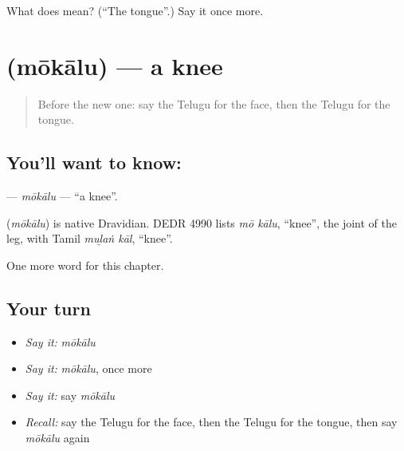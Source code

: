 \begin{tcolorbox}[breakable,colback=teal!4,colframe=teal!35!black,title={Before you move on}]
What does  mean? (\textquotedblleft{}The tongue\textquotedblright{}.) Say it once more.
\end{tcolorbox}
\section[\texorpdfstring{\te{మోకాలు} (mōkālu)}{మోకాలు (mōkālu)}]{ (mōkālu) — a knee}

\label{lesson:TE-C127-mokalu}



\begin{quote}
Before the new one: say the Telugu for the face, then the Telugu for the tongue.
\end{quote}

\subsection*{You'll want to know: }
\textbf{} — \emph{mōkālu} — \textquotedblleft{}a knee\textquotedblright{}.

\begin{cousinweb}
\textbf{} (\emph{mōkālu}) is native Dravidian. DEDR 4990 lists \emph{mō kālu}, \textquotedblleft{}knee\textquotedblright{}, the joint of the leg, with Tamil \emph{muḻaṅ kāl}, \textquotedblleft{}knee\textquotedblright{}.
\end{cousinweb}

\begin{grammarlens}[title={What you've built}]
One more word for this chapter.
\end{grammarlens}

\subsection*{Your turn}
\begin{itemize}
\raggedright
  \item \emph{Say it:} \emph{mōkālu}
  \item \emph{Say it:} \emph{mōkālu}, once more
  \item \emph{Say it:} say \emph{mōkālu}
  \item \emph{Recall:} say the Telugu for the face, then the Telugu for the tongue, then say \emph{mōkālu} again
\end{itemize}

